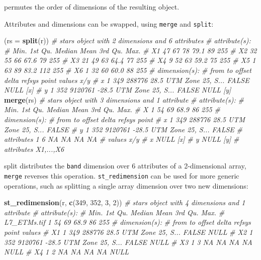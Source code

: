 \documentclass[]{book}
\newenvironment{Shaded}{\begin{snugshade}}{\end{snugshade}}
\newcommand{\CommentTok}[1]{\textcolor[rgb]{0.56,0.35,0.01}{\textit{#1}}}
\newcommand{\DataTypeTok}[1]{\textcolor[rgb]{0.13,0.29,0.53}{#1}}
\newcommand{\DecValTok}[1]{\textcolor[rgb]{0.00,0.00,0.81}{#1}}
\newcommand{\KeywordTok}[1]{\textcolor[rgb]{0.13,0.29,0.53}{\textbf{#1}}}
\newcommand{\NormalTok}[1]{#1}
\begin{document}
permutes the order of dimensions of the resulting object.

Attributes and dimensions can be swapped, using \texttt{merge} and \texttt{split}:

\begin{Shaded}
\begin{Highlighting}[]
\NormalTok{(}\DataTypeTok{rs =} \KeywordTok{split}\NormalTok{(r))}
\CommentTok{# stars object with 2 dimensions and 6 attributes}
\CommentTok{# attribute(s):}
\CommentTok{#     Min. 1st Qu. Median Mean 3rd Qu. Max.}
\CommentTok{# X1    47      67     78 79.1      89  255}
\CommentTok{# X2    32      55     66 67.6      79  255}
\CommentTok{# X3    21      49     63 64.4      77  255}
\CommentTok{# X4     9      52     63 59.2      75  255}
\CommentTok{# X5     1      63     89 83.2     112  255}
\CommentTok{# X6     1      32     60 60.0      88  255}
\CommentTok{# dimension(s):}
\CommentTok{#   from  to  offset delta            refsys point values x/y}
\CommentTok{# x    1 349  288776  28.5 UTM Zone 25, S... FALSE   NULL [x]}
\CommentTok{# y    1 352 9120761 -28.5 UTM Zone 25, S... FALSE   NULL [y]}
\KeywordTok{merge}\NormalTok{(rs)}
\CommentTok{# stars object with 3 dimensions and 1 attribute}
\CommentTok{# attribute(s):}
\CommentTok{#    Min. 1st Qu. Median Mean 3rd Qu. Max.}
\CommentTok{# X     1      54     69 68.9      86  255}
\CommentTok{# dimension(s):}
\CommentTok{#            from  to  offset delta            refsys point}
\CommentTok{# x             1 349  288776  28.5 UTM Zone 25, S... FALSE}
\CommentTok{# y             1 352 9120761 -28.5 UTM Zone 25, S... FALSE}
\CommentTok{# attributes    1   6      NA    NA                NA    NA}
\CommentTok{#               values x/y}
\CommentTok{# x               NULL [x]}
\CommentTok{# y               NULL [y]}
\CommentTok{# attributes X1,...,X6}
\end{Highlighting}
\end{Shaded}

split distributes the \texttt{band} dimension over 6 attributes of a
2-dimensional array, \texttt{merge} reverses this operation. \texttt{st\_redimension}
can be used for more generic operations, such as splitting a single array
dimension over two new dimensions:

\begin{Shaded}
\begin{Highlighting}[]
\KeywordTok{st_redimension}\NormalTok{(r, }\KeywordTok{c}\NormalTok{(}\DecValTok{349}\NormalTok{, }\DecValTok{352}\NormalTok{, }\DecValTok{3}\NormalTok{, }\DecValTok{2}\NormalTok{))}
\CommentTok{# stars object with 4 dimensions and 1 attribute}
\CommentTok{# attribute(s):}
\CommentTok{#              Min. 1st Qu. Median Mean 3rd Qu. Max.}
\CommentTok{# L7_ETMs.tif     1      54     69 68.9      86  255}
\CommentTok{# dimension(s):}
\CommentTok{#    from  to  offset delta            refsys point values}
\CommentTok{# X1    1 349  288776  28.5 UTM Zone 25, S... FALSE   NULL}
\CommentTok{# X2    1 352 9120761 -28.5 UTM Zone 25, S... FALSE   NULL}
\CommentTok{# X3    1   3      NA    NA                NA    NA   NULL}
\CommentTok{# X4    1   2      NA    NA                NA    NA   NULL}
\end{Highlighting}
\end{Shaded}
\end{document}
